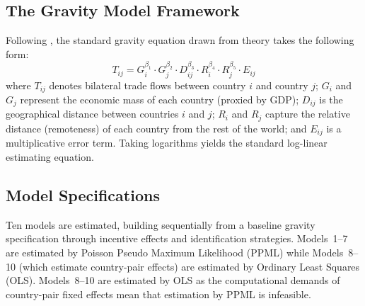 %
%
%

\subsection{The Gravity Model Framework}
\label{sec:gravity_framework}

Following \citet{kimura2006}, the standard gravity equation drawn from theory takes the following form:
\begin{equation}
T_{ij} = G_i^{\beta_1} \cdot G_j^{\beta_2} \cdot D_{ij}^{\beta_3} \cdot R_i^{\beta_4} \cdot R_j^{\beta_5} \cdot E_{ij}
\label{eq:gravity_structural}
\end{equation}
where $T_{ij}$ denotes bilateral trade flows between country $i$ and country $j$; $G_i$ and $G_j$ represent the economic mass of each country (proxied by GDP); $D_{ij}$ is the geographical distance between countries $i$ and $j$; $R_i$ and $R_j$ capture the relative distance (remoteness) of each country from the rest of the world; and $E_{ij}$ is a multiplicative error term. Taking logarithms yields the standard log-linear estimating equation.

\subsection{Model Specifications}
\label{sec:specifications}

Ten models are estimated, building sequentially from a baseline gravity specification through incentive effects and identification strategies. Models~1--7 are estimated by Poisson Pseudo Maximum Likelihood (PPML) while Models~8--10 (which estimate country-pair effects) are estimated by Ordinary Least Squares (OLS). Models~8--10 are estimated by OLS as the computational demands of country-pair fixed effects mean that estimation by PPML is infeasible.

